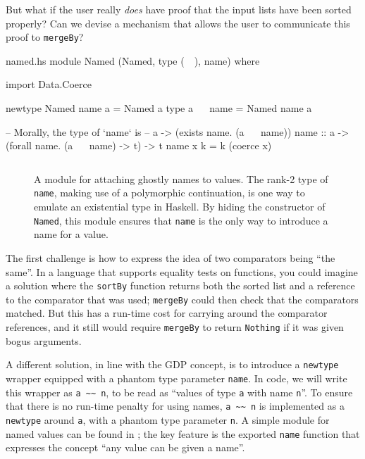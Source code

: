 \documentclass[format=sigplan, review=false, screen=true, 10pt]{acmart}
\makeatletter
\let\origsubsection\subsection
\renewcommand\subsection{\@ifstar{\starsubsection}{\nostarsubsection}}
\newcommand\nostarsubsection[1]
{\subsectionprelude\origsubsection{#1}\subsectionpostlude}
\newcommand\starsubsection[1]
{\subsectionprelude\origsubsection*{#1}\subsectionpostlude}
\newcommand\subsectionprelude{%
  \vspace{-0.25em}
}
\newcommand\subsectionpostlude{%
  \vspace{-0.05em}
}
\makeatother
\begin{document}
But what if the user really \emph{does} have proof that the input lists have
been sorted properly? Can we devise a mechanism that allows the user to communicate
this proof to \texttt{mergeBy}?


\begin{filecontents*}{named.hs}
module Named (Named, type (~~), name) where

import Data.Coerce

newtype Named name a = Named a
type a ~~ name = Named name a

-- Morally, the type of `name` is
--      a -> (exists name. (a ~~ name))
name :: a -> (forall name. (a ~~ name) -> t) -> t
name x k = k (coerce x)
\end{filecontents*}
\begin{figure}[b]
  \inputminted{haskell}{named.hs}
  \caption{A module for attaching ghostly names to values. The rank-2 type of \texttt{name},
    making use of a polymorphic continuation, is one way to emulate an existential type in
    Haskell. By hiding the constructor of \texttt{Named}, this module ensures that \texttt{name}
    is the only way to introduce a name for a value.
    \label{name-module}}
\end{figure}
\subsection{Conjuring a name}

The first challenge is how to express the idea of two  comparators
being ``the same''. In a language that supports equality tests on functions,
you could imagine a solution where the \texttt{sortBy} function returns both the sorted
list and a reference to the comparator that was used; \texttt{mergeBy} could
then check that the comparators matched. But this has a run-time cost for carrying
around the comparator references, and it still would require \texttt{mergeBy} to
return \texttt{Nothing} if it was given bogus arguments.

A different solution, in line with the GDP concept, is to introduce a \texttt{newtype} wrapper equipped with
a phantom type parameter \texttt{name}.
In code, we will write this wrapper as \verb|a ~~ n|, to be read as
``values of type \texttt{a} with name \texttt{n}''. To ensure that there is no
run-time penalty for using names, \verb|a ~~ n| is implemented as a \texttt{newtype}
around \texttt{a}, with a phantom type parameter \texttt{n}. A simple module for named values
can be found in ; the key feature is the exported \texttt{name}
function that expresses the concept ``any value can be given a name''.
\end{document}
